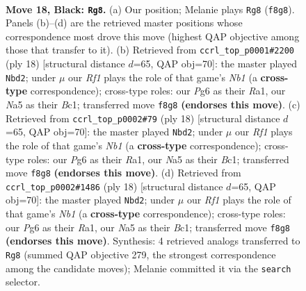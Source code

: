 \documentclass[11pt]{article}
\begin{document}
\clearpage

\begin{figure}[p]\centering
\begin{subfigure}{0.46\textwidth}\centering
\resizebox{\linewidth}{!}{%
\newchessgame
\chessboard[
  setfen={2bqnr2/r3bpkp/p2p2p1/n1pBp3/Pp2P3/3P3N/1PPBQPPP/RN2R1K1 b - - 5 18},
  showmover=false,
  pgfstyle=straightmove, color=movearrow, markmove={f8-g8}
]}
\caption{}
\end{subfigure}\hfill
\begin{subfigure}{0.46\textwidth}\centering
\resizebox{\linewidth}{!}{%
\newchessgame
\chessboard[
  setfen={r1bq1rk1/1pp1nppp/1b1p1n2/pP2p3/P1B1P3/2PP1N2/5PPP/RNBQ1RK1 w - - 3 10},
  showmover=false,
  pgfstyle=straightmove, color=movearrow, markmove={b1-d2}
]}
\caption{}
\end{subfigure}
\\[4pt]
\begin{subfigure}{0.46\textwidth}\centering
\resizebox{\linewidth}{!}{%
\newchessgame
\chessboard[
  setfen={r1bq1rk1/1pp1nppp/1b1p1n2/pP2p3/P1B1P3/2PP1N2/5PPP/RNBQ1RK1 w - - 3 10},
  showmover=false,
  pgfstyle=straightmove, color=movearrow, markmove={b1-d2}
]}
\caption{}
\end{subfigure}\hfill
\begin{subfigure}{0.46\textwidth}\centering
\resizebox{\linewidth}{!}{%
\newchessgame
\chessboard[
  setfen={r1bq1rk1/1pp1nppp/1b1p1n2/pP2p3/P1B1P3/2PP1N2/5PPP/RNBQ1RK1 w - - 3 10},
  showmover=false,
  pgfstyle=straightmove, color=movearrow, markmove={b1-d2}
]}
\caption{}
\end{subfigure}
\caption{\textbf{Move 18, Black: \texttt{Rg8}.} (a) Our position; Melanie plays \texttt{Rg8} (\texttt{f8g8}). Panels (b)--(d) are the retrieved master positions whose correspondence most drove this move (highest QAP objective among those that transfer to it). (b) Retrieved from \texttt{ccrl\_top\_p0001\#2200} (ply 18) [structural distance $d$=65, QAP obj=70]: the master played \texttt{Nbd2}; under $\mu$ our \emph{Rf1} plays the role of that game's \emph{Nb1} (a \textbf{cross-type} correspondence); cross-type roles: our \emph{P}g6 as their \emph{R}a1, our \emph{N}a5 as their \emph{B}c1; transferred move \texttt{f8g8} \textbf{(endorses this move)}. (c) Retrieved from \texttt{ccrl\_top\_p0002\#79} (ply 18) [structural distance $d$=65, QAP obj=70]: the master played \texttt{Nbd2}; under $\mu$ our \emph{Rf1} plays the role of that game's \emph{Nb1} (a \textbf{cross-type} correspondence); cross-type roles: our \emph{P}g6 as their \emph{R}a1, our \emph{N}a5 as their \emph{B}c1; transferred move \texttt{f8g8} \textbf{(endorses this move)}. (d) Retrieved from \texttt{ccrl\_top\_p0002\#1486} (ply 18) [structural distance $d$=65, QAP obj=70]: the master played \texttt{Nbd2}; under $\mu$ our \emph{Rf1} plays the role of that game's \emph{Nb1} (a \textbf{cross-type} correspondence); cross-type roles: our \emph{P}g6 as their \emph{R}a1, our \emph{N}a5 as their \emph{B}c1; transferred move \texttt{f8g8} \textbf{(endorses this move)}. Synthesis: 4 retrieved analogs transferred to \texttt{Rg8} (summed QAP objective 279, the strongest correspondence among the candidate moves); Melanie committed it via the \texttt{search} selector.}

\end{figure}
\end{document}
